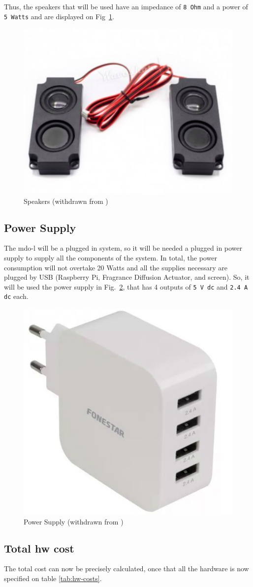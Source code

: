 Thus, the speakers that will be used have an impedance of \texttt{8 Ohm} and a power of \texttt{5 Watts} and are displayed on Fig~\ref{fig:speakers}.
%
\begin{figure}[htb!]
\centering
    \includegraphics[width=0.4\columnwidth]{./img/speakers.png}
  \caption{Speakers (withdrawn from \cite{speakers})}%
\label{fig:speakers}
\end{figure}

\subsection{Power Supply}

The \gls{mdo-l} will be a plugged in system, so it will be needed a plugged in power supply to supply all the components of the system. In total, the power consumption will not overtake 20 Watts and all the supplies necessary are plugged by USB (Raspberry Pi, Fragrance Diffusion Actuator, and screen). So, it will be used the power supply in Fig.~\ref{fig:power-supply}, that has 4 outputs of \texttt{5 V \gls{dc}} and \texttt{2.4 A \gls{dc}} each.
%
\begin{figure}[htb!]
\centering
    \includegraphics[width=0.3\columnwidth]{./img/power-supply.png}
  \caption{Power Supply (withdrawn from \cite{power-supply})}%
\label{fig:power-supply}
\end{figure}

\subsection{Total \gls{hw} cost}

The total cost can now be precisely calculated, once that all the hardware is now specified on table \ref{tab:hw-costs}.

